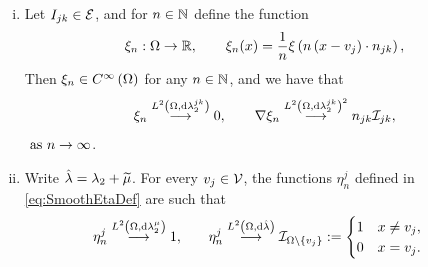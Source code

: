 \begin{lemma} \label{lem:SI-SmoothFunctionsResults}
	\begin{enumerate}[(i)]
		\item Let $I_{jk}\in\mathcal{E}$, and for $n\in\mathbb{N}$ define the function
		\begin{align*}
			\xi_n:\Omega\rightarrow\mathbb{R}, \qquad \xi_n(x) = \frac{1}{n}\xi\left( n\left( x-v_j \right)\cdot n_{jk} \right),
		\end{align*}
		Then $\xi_n\in C^{\infty}\left( \Omega \right)$ for any $n\in\mathbb{N}$, and we have that
		\begin{align*}
			\xi_n \overset{L^{2}\left( \Omega,\mathrm{d} \lambda_2^{jk} \right)}{\longrightarrow} 0, \qquad
			\nabla\xi_n \overset{L^{2}\left( \Omega,\mathrm{d} \lambda_2^{jk} \right)^2}{\longrightarrow} n_{jk}\mathcal{I}_{jk},
		\end{align*}
		$\ \text{as} \ n \rightarrow\infty$.
		\item Write $\hat{\lambda} = \lambda_2 + \widetilde{\mu}$.
		For every $v_j\in\mathcal{V}$, the functions $\eta_n^j$ defined in \eqref{eq:SmoothEtaDef} are such that
		\begin{align*}
			\eta_n^j \overset{L^{2}\left( \Omega,\mathrm{d} \lambda_2^{\mu} \right)}{\longrightarrow} 1,
			&\qquad
			\eta_n^j \overset{L^{2}\left( \Omega,\mathrm{d} \hat{\lambda} \right)}{\longrightarrow} \mathcal{I}_{\Omega\setminus\left\{ v_j \right\}} := \begin{cases} 1 & x\neq v_j, \\ 0 & x=v_j. \end{cases}
		\end{align*}
	\end{enumerate}
\end{lemma}

